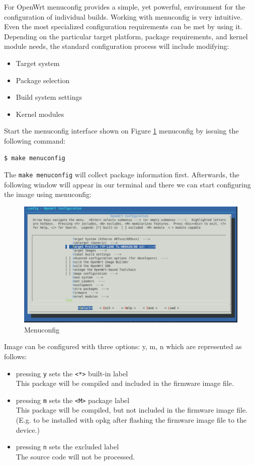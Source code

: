 For OpenWrt menuconfig provides a simple, yet powerful, environment for the configuration of individual builds.
Working with menuconfig is very intuitive.
Even the most specialized configuration requirements can be met by using it.
Depending on the particular target platform, package requirements, and kernel module needs, the standard configuration process will include modifying:\\
\begin{itemize}
    \item Target system
    \item Package selection
    \item Build system settings
    \item Kernel modules
\end{itemize}
Start the menuconfig interface shown on Figure \ref{fig_menuconfig} menuconfig by issuing the following command:
\begin{lstlisting}[columns=fixed,basicstyle=\ttfamily\footnotesize,tabsize=4,backgroundcolor=\color{yellow!10}]
$ make menuconfig
\end{lstlisting}
The {\tt make menuconfig} will collect package information first.
Afterwards, the following window will appear in our terminal and there we can start configuring the image using menuconfig:\\
\begin{figure}[H]
    \centering
    \includegraphics[scale=0.6]{figures/make_menuconfig.pdf}
    \caption{Menuconfig}
    \label{fig_menuconfig}
\end{figure}
Image can be configured with three options: y, m, n which are represented as follows:
\begin{itemize}
\item pressing {\tt y} sets the {\tt <*>} built-in label\\
This package will be compiled and included in the firmware image file.
\item pressing {\tt m} sets the {\tt <M>} package label\\
This package will be compiled, but not included in the firmware image file. (E.g. to be installed with opkg after flashing the firmware image file to the device.)
\item pressing {\tt n} sets the {\tt < >} excluded label\\
The source code will not be processed.
\end{itemize}
